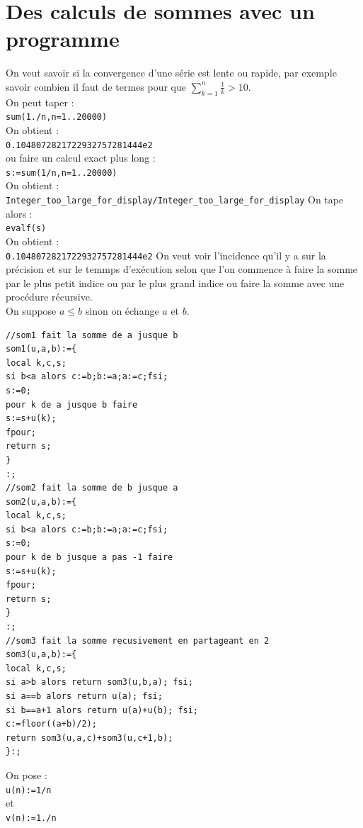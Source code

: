 \documentclass[a4paper,11pt]{book}
\begin{document}
\section{Des calculs de sommes avec un programme}
On veut savoir si la convergence d'une s\'erie est lente ou rapide, par exemple 
savoir combien il faut de termes pour que
$\sum_{k=1}^n\frac{1}{k}>10$.\\
On peut taper :\\
{\tt sum(1./n,n=1..20000)}\\
On obtient :\\
{\tt 0.1048072821722932757281444e2}\\
ou faire un calcul exact plus long :\\
{\tt s:=sum(1/n,n=1..20000)}\\
On obtient :\\
{\tt Integer\_too\_large\_for\_display/Integer\_too\_large\_for\_display}
On tape alors :\\
{\tt evalf(s)}\\
On obtient :\\
{\tt 0.1048072821722932757281444e2}
On veut voir l'incidence qu'il y a sur la pr\'ecision et sur le temmps 
d'ex\'ecution selon que l'on commence \`a faire la somme par le plus petit 
indice ou par le plus grand indice ou faire la somme avec une proc\'edure 
r\'ecursive.\\
On suppose $a\leq b$ sinon on \'echange $a$ et $b$.
\begin{verbatim}
//som1 fait la somme de a jusque b 
som1(u,a,b):={
local k,c,s;
si b<a alors c:=b;b:=a;a:=c;fsi;
s:=0;
pour k de a jusque b faire
s:=s+u(k);
fpour;
return s;
}
:;
//som2 fait la somme de b jusque a
som2(u,a,b):={
local k,c,s;
si b<a alors c:=b;b:=a;a:=c;fsi;
s:=0;
pour k de b jusque a pas -1 faire
s:=s+u(k);
fpour;
return s;
}
:;
//som3 fait la somme recusivement en partageant en 2
som3(u,a,b):={
local k,c,s;
si a>b alors return som3(u,b,a); fsi;
si a==b alors return u(a); fsi;
si b==a+1 alors return u(a)+u(b); fsi; 
c:=floor((a+b)/2);
return som3(u,a,c)+som3(u,c+1,b);
}:;
\end{verbatim}
On pose :\\
{\tt u(n):=1/n}\\
et\\
{\tt v(n):=1./n}
\end{document}
